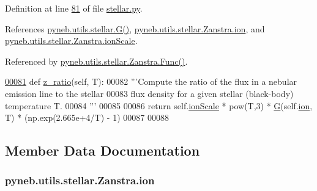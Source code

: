 Definition at line \hyperlink{stellar_8py_source_l00081}{81} of file \hyperlink{stellar_8py_source}{stellar.\+py}.



References \hyperlink{stellar_8py_source_l00047}{pyneb.\+utils.\+stellar.\+G()}, \hyperlink{stellar_8py_source_l00069}{pyneb.\+utils.\+stellar.\+Zanstra.\+ion}, and \hyperlink{stellar_8py_source_l00076}{pyneb.\+utils.\+stellar.\+Zanstra.\+ion\+Scale}.



Referenced by \hyperlink{stellar_8py_source_l00089}{pyneb.\+utils.\+stellar.\+Zanstra.\+Func()}.


\begin{DoxyCode}
\hypertarget{classpyneb_1_1utils_1_1stellar_1_1_zanstra_l00081}{}\hyperlink{classpyneb_1_1utils_1_1stellar_1_1_zanstra_a09b6512a0ca6dbab445c4bdab0b68061}{00081}     \textcolor{keyword}{def }\hyperlink{classpyneb_1_1utils_1_1stellar_1_1_zanstra_a09b6512a0ca6dbab445c4bdab0b68061}{z\_ratio}(self, T):
00082         \textcolor{stringliteral}{'''Compute the ratio of the flux in a nebular emission line to the stellar }
00083 \textcolor{stringliteral}{           flux density for a given stellar (black-body) temperature T.}
00084 \textcolor{stringliteral}{        '''}
00085 
00086         \textcolor{keywordflow}{return} self.\hyperlink{classpyneb_1_1utils_1_1stellar_1_1_zanstra_a8f04a2133b2acf4641a2ce08db7fc100}{ionScale} * pow(T,3) * \hyperlink{namespacepyneb_1_1utils_1_1stellar_a8a89c2764d0517d414e8da6c2031d601}{G}(self.\hyperlink{classpyneb_1_1utils_1_1stellar_1_1_zanstra_a48c1797d46d49841c8b3a9275679e3ae}{ion}, T) * (np.exp(2.665e+4/T) - 1)
00087 
00088 
\end{DoxyCode}


\subsection{Member Data Documentation}
\hypertarget{classpyneb_1_1utils_1_1stellar_1_1_zanstra_a48c1797d46d49841c8b3a9275679e3ae}{}
\subsubsection[{ion}]{\setlength{\rightskip}{0pt plus 5cm}pyneb.\+utils.\+stellar.\+Zanstra.\+ion}\label{classpyneb_1_1utils_1_1stellar_1_1_zanstra_a48c1797d46d49841c8b3a9275679e3ae}



